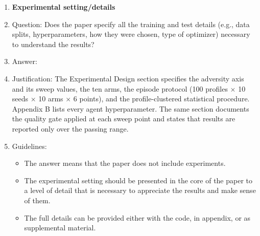 \begin{enumerate}
\item {\bf Experimental setting/details}
    \item[] Question: Does the paper specify all the training and test details (e.g., data splits, hyperparameters, how they were chosen, type of optimizer) necessary to understand the results?
    \item[] Answer: \answerYes{}
    \item[] Justification: The Experimental Design section specifies the adversity axis and its sweep values, the ten arms, the episode protocol (100 profiles $\times$ 10 seeds $\times$ 10 arms $\times$ 6 points), and the profile-clustered statistical procedure. Appendix B lists every agent hyperparameter. The same section documents the quality gate applied at each sweep point and states that results are reported only over the passing range.
    \item[] Guidelines:
    \begin{itemize}
        \item The answer \answerNA{} means that the paper does not include experiments.
        \item The experimental setting should be presented in the core of the paper to a level of detail that is necessary to appreciate the results and make sense of them.
        \item The full details can be provided either with the code, in appendix, or as supplemental material.
    \end{itemize}


\end{enumerate}
